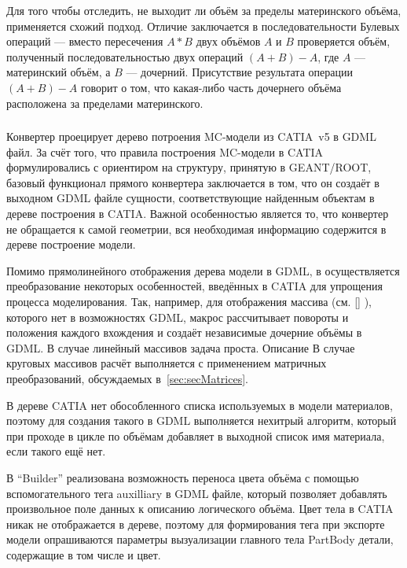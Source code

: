 Для того чтобы отследить, не выходит ли объём за пределы материнского объёма, применяется схожий подход. Отличие заключается в последовательности Булевых операций --- вместо пересечения $A*B$ двух объёмов $A$ и $B$ проверяется объём, полученный последовательностью двух операций $(A+B)-A$, где $A$ --- материнский объём, а $B$ --- дочерний. Присутствие результата операции $(A+B)-A$ говорит о том, что какая-либо часть дочернего объёма расположена за пределами материнского.

\subsubsection{}\label{sec:CATIA2GDML}

Конвертер  проецирует дерево потроения MC-модели из CATIA~v5 в GDML файл. За счёт того, что правила построения MC-модели в CATIA формулировались с ориентиром на структуру, принятую в GEANT/ROOT, базовый функционал прямого конвертера заключается в том, что он создаёт в выходном GDML файле сущности, соответствующие найденным объектам в дереве построения в CATIA. Важной особенностью является то, что конвертер не обращается к самой геометрии, вся необходимая информацию содержится в дереве построение модели.

Помимо прямолинейного отображения дерева модели в GDML, в  осуществляется преобразование некоторых особенностей, введённых в CATIA для упрощения процесса моделирования. Так, например, для отображения массива (см. \ref{} \todo), которого нет в возможностях GDML, макрос рассчитывает повороты и положения каждого вхождения и создаёт независимые дочерние объёмы в GDML. В случае линейный массивов задача проста. Описание \todo В случае круговых массивов расчёт выполняется с применением матричных преобразований, обсуждаемых в~\ref{sec:secMatrices}.

В дереве CATIA нет обособленного списка используемых в модели материалов, поэтому для создания такого в GDML выполняется нехитрый алгоритм, который при проходе в цикле по объёмам добавляет в выходной список имя материала, если такого ещё нет.

В ``Builder'' реализована возможность переноса цвета объёма с помощью вспомогательного тега auxilliary в GDML файле, который позволяет добавлять произвольное поле данных к описанию логического объёма. Цвет тела в CATIA никак не отображается в дереве, поэтому для формирования тега при экспорте модели опрашиваются параметры вызуализации главного тела PartBody детали, содержащие в том числе и цвет.

